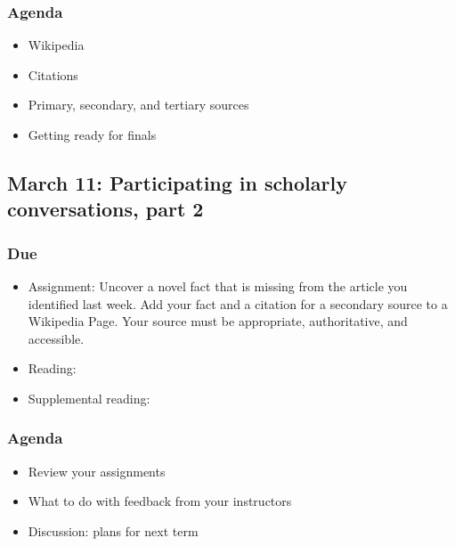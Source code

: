 \documentclass[12pt,article,oneside]{memoir}
\begin{document}
\subsubsection{Agenda}
\begin{itemize}
\item Wikipedia
\item Citations
\item Primary, secondary, and tertiary sources
\item Getting ready for finals
\end{itemize}


\subsection{March 11: Participating in scholarly conversations, part 2}
\subsubsection{Due}
\begin{itemize}
 \item Assignment: Uncover a novel fact that is missing from the article you identified last week.  Add your fact and a citation for a secondary source to a Wikipedia Page.  Your source must be appropriate, authoritative, and accessible.
 \item Reading: \cite{eryk}
 \item Supplemental reading: \cite{doyle}
\end{itemize}

\subsubsection{Agenda}
\begin{itemize}
\item Review your assignments
\item What to do with feedback from your instructors
\item Discussion: plans for next term
\end{itemize}


\newpage
\renewcommand{\bibname}{Reading list}
{}

\end{document}
